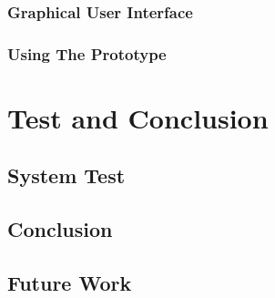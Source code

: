 		\section{Graphical User Interface}
			\label{sec:gui}	
			
			
		\section{Using The Prototype}
			\label{sec:using prototype}
			

\part{Test and Conclusion}		
\chapter{System Test}
	\label{sec:system-test}
	
	
\chapter{Conclusion}
	\label{sec:conclusion}
	
	
\chapter{Future Work}
	\label{sec:futurework}
	



\listoffixmes


